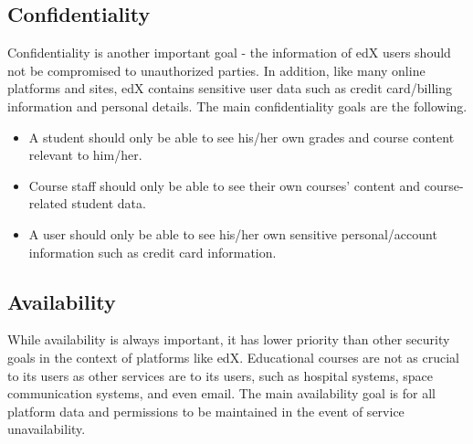 \documentclass[11pt]{article}
\begin{document}
\subsection{Confidentiality}
Confidentiality is another important goal - the information of edX users should not be compromised to unauthorized parties. In addition, like many online platforms and sites, edX contains sensitive user data such as credit card/billing information and personal details. The main confidentiality goals are the following.
\begin{itemize}
\item A student should only be able to see his/her own grades and course content relevant to him/her.
\item Course staff should only be able to see their own courses' content and course-related student data.
\item A user should only be able to see his/her own sensitive personal/account information such as credit card information.
\end{itemize}

\subsection{Availability}
While availability is always important, it has lower priority than other security goals in the context of platforms like edX. Educational courses are not as crucial to its users as other services are to its users, such as hospital systems, space communication systems, and even email. The main availability goal is for all platform data and permissions to be maintained in the event of service unavailability.
\end{document}
